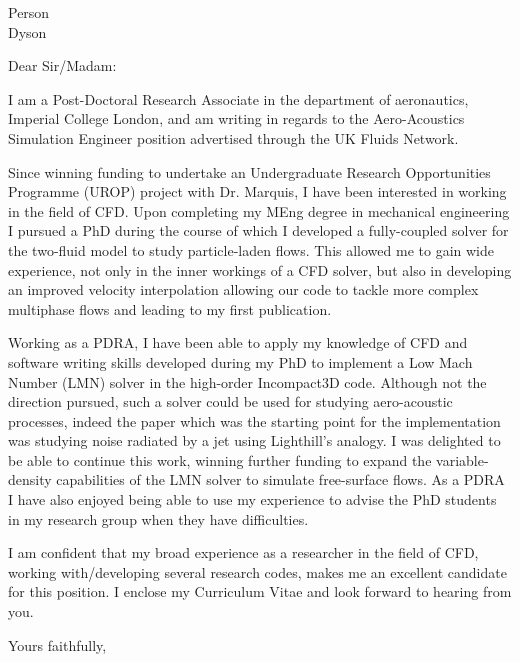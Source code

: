 \documentclass[10pt, a4paper]{letter}
\begin{document}
\begin{letter}{Person\\Dyson}

  \opening{Dear Sir/Madam:}

  I am a Post-Doctoral Research Associate in the department of aeronautics, Imperial College London,
  and am writing in regards to the Aero-Acoustics Simulation Engineer position advertised through
  the UK Fluids Network.

  Since winning funding to undertake an Undergraduate Research Opportunities Programme (UROP)
  project with Dr. Marquis, I have been interested in working in the field of CFD.
  Upon completing my MEng degree in mechanical engineering I pursued a PhD during the course of
  which I developed a fully-coupled solver for the two-fluid model to study particle-laden flows.
  This allowed me to gain wide experience, not only in the inner workings of a CFD solver, but also
  in developing an improved velocity interpolation allowing our code to tackle more complex
  multiphase flows and leading to my first publication.

  Working as a PDRA, I have been able to apply my knowledge of CFD and software writing skills
  developed during my PhD to implement a Low Mach Number (LMN) solver in the high-order Incompact3D
  code.
  Although not the direction pursued, such a solver could be used for studying aero-acoustic
  processes, indeed the paper which was the starting point for the implementation was studying noise
  radiated by a jet using Lighthill's analogy.
  I was delighted to be able to continue this work, winning further funding to expand the
  variable-density capabilities of the LMN solver to simulate free-surface flows.
  As a PDRA I have also enjoyed being able to use my experience to advise the PhD students in my
  research group when they have difficulties.
  
  I am confident that my broad experience as a researcher in the field of CFD, working
  with/developing several research codes, makes me an excellent candidate for this position.
  I enclose my Curriculum Vitae and look forward to hearing from you.

  \closing{Yours faithfully,}
  
\end{letter}
\end{document}
